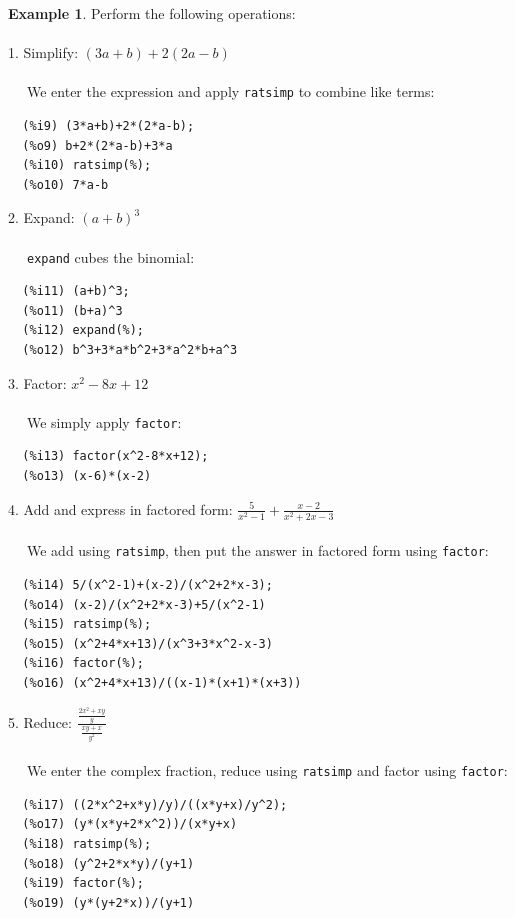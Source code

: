 \documentclass[10.5pt,twoside]{report}
\theoremstyle{definition}
\newtheorem{exmp}{Example}[section]
\begin{document}
\begin{exmp} Perform the following operations:\\
${}$\\
 

1. Simplify:  $(3a+b)+2(2a-b)$\\
${}$\\
\verb|  | We enter the expression and apply \verb|ratsimp| to combine like terms:

\begin{verbatim}
  (%i9) (3*a+b)+2*(2*a-b);
  (%o9) b+2*(2*a-b)+3*a
  (%i10) ratsimp(%);
  (%o10) 7*a-b
\end{verbatim}


2. Expand:  $(a+b)^3$\\
${}$\\
\verb|  | \verb|expand| cubes the binomial:

\begin{verbatim}
  (%i11) (a+b)^3;
  (%o11) (b+a)^3
  (%i12) expand(%);
  (%o12) b^3+3*a*b^2+3*a^2*b+a^3
\end{verbatim}

3.  Factor:  $x^2-8x+12$\\
${}$\\
\verb|  | We simply apply \verb|factor|:

\begin{verbatim}
  (%i13) factor(x^2-8*x+12);
  (%o13) (x-6)*(x-2)
\end{verbatim}


4.  Add and express in factored form:  $\frac{5}{x^2-1}+ \frac{x-2}{x^2+2x-3}$\\
${}$\\
\verb|  | We add using \verb|ratsimp|, then put the answer in factored form using \verb|factor|:

\begin{verbatim}
  (%i14) 5/(x^2-1)+(x-2)/(x^2+2*x-3);
  (%o14) (x-2)/(x^2+2*x-3)+5/(x^2-1)
  (%i15) ratsimp(%);
  (%o15) (x^2+4*x+13)/(x^3+3*x^2-x-3)
  (%i16) factor(%);
  (%o16) (x^2+4*x+13)/((x-1)*(x+1)*(x+3))
\end{verbatim}


5.  Reduce:  $\frac{\frac{2x^2+xy}{y}}{\frac{xy+x}{y^2}}$\\
${}$\\
\verb|  | We enter the complex fraction, reduce using \verb|ratsimp| and factor using \verb|factor|:

\begin{verbatim}
  (%i17) ((2*x^2+x*y)/y)/((x*y+x)/y^2);
  (%o17) (y*(x*y+2*x^2))/(x*y+x)
  (%i18) ratsimp(%);
  (%o18) (y^2+2*x*y)/(y+1)
  (%i19) factor(%);
  (%o19) (y*(y+2*x))/(y+1)
\end{verbatim}


\end{exmp}
\end{document}
